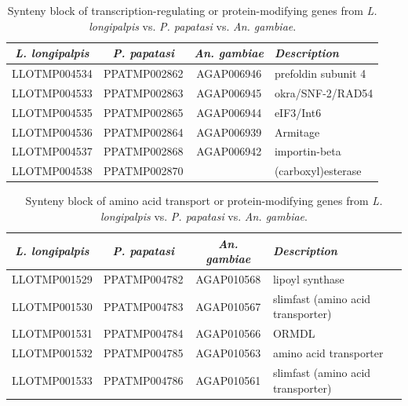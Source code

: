 \begin{table}[H]
  \centering
  \begin{tabular}{c c c l} \hline
    \emph{L. longipalpis} & \emph{P. papatasi} & \emph{An. gambiae} & \emph{Description} \\ \hline
    LLOTMP004534 & PPATMP002862 & AGAP006946 & prefoldin subunit 4 \\
    LLOTMP004533 & PPATMP002863 & AGAP006945 & okra/SNF-2/RAD54 \\
    LLOTMP004535 & PPATMP002865 & AGAP006944 & eIF3/Int6 \\
    LLOTMP004536 & PPATMP002864 & AGAP006939 & Armitage \\
    LLOTMP004537 & PPATMP002868 & AGAP006942 & importin-beta \\
    LLOTMP004538 & PPATMP002870 & & (carboxyl)esterase
    \end{tabular}
    \caption{Synteny block of transcription-regulating or protein-modifying genes from \emph{L. longipalpis} vs. \emph{P. papatasi} vs. \emph{An. gambiae}.}
  \label{tab:synteny-three-way-transcription}
\end{table}

\begin{table}[H]
  \centering
  \begin{tabular}{c c c l} \hline
    \emph{L. longipalpis} & \emph{P. papatasi} & \emph{An. gambiae} & \emph{Description} \\ \hline
    LLOTMP001529 & PPATMP004782 & AGAP010568 & lipoyl synthase \\
    LLOTMP001530 & PPATMP004783 & AGAP010567 & slimfast (amino acid transporter) \\
    LLOTMP001531 & PPATMP004784 & AGAP010566 & ORMDL \\
    LLOTMP001532 & PPATMP004785 & AGAP010563 & amino acid transporter \\
    LLOTMP001533 & PPATMP004786 & AGAP010561 & slimfast (amino acid transporter)
    \end{tabular}
    \caption{Synteny block of amino acid transport or protein-modifying genes from \emph{L. longipalpis} vs. \emph{P. papatasi} vs. \emph{An. gambiae}.}
  \label{tab:synteny-three-way-amino}
\end{table}

